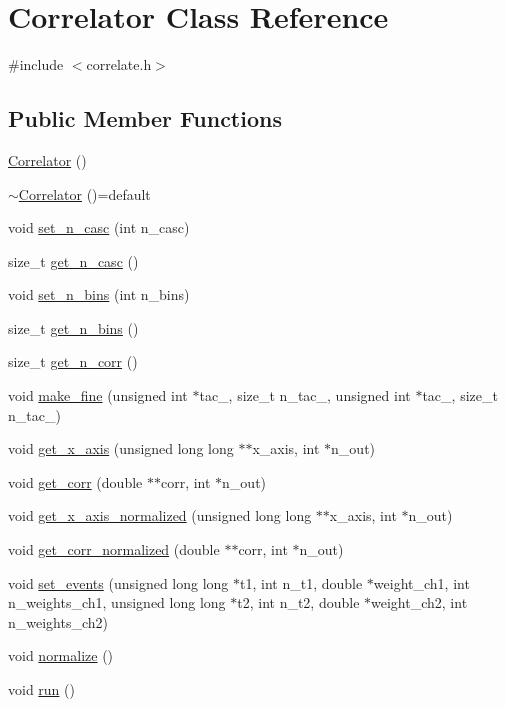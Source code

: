 \hypertarget{class_correlator}{}\section{Correlator Class Reference}
\label{class_correlator}


{\ttfamily \#include $<$correlate.\+h$>$}

\subsection*{Public Member Functions}
\begin{DoxyCompactItemize}
\item 
\hyperlink{class_correlator_a6114955836dba0b4b61138490cd3fe91}{Correlator} ()
\item 
\hyperlink{class_correlator_a85102747d6ae6ff216218a001683b942}{$\sim$\+Correlator} ()=default
\item 
void \hyperlink{class_correlator_a8e96a0c2d5235e912965632b280da01b}{set\+\_\+n\+\_\+casc} (int n\+\_\+casc)
\item 
size\+\_\+t \hyperlink{class_correlator_a0240bc7c9704530dcd61cdd2713143b3}{get\+\_\+n\+\_\+casc} ()
\item 
void \hyperlink{class_correlator_adbce9483839ba3985398176a5cf1822e}{set\+\_\+n\+\_\+bins} (int n\+\_\+bins)
\item 
size\+\_\+t \hyperlink{class_correlator_a0f11555de3ab1c568f2c849e849a513e}{get\+\_\+n\+\_\+bins} ()
\item 
size\+\_\+t \hyperlink{class_correlator_a657815ec6b5c96624826bdbe0ec8d4d9}{get\+\_\+n\+\_\+corr} ()
\item 
void \hyperlink{class_correlator_a98605e701052a2fefc798424483909b0}{make\+\_\+fine} (unsigned int $\ast$tac\+\_, size\+\_\+t n\+\_\+tac\+\_, unsigned int $\ast$tac\+\_, size\+\_\+t n\+\_\+tac\+\_)
\item 
void \hyperlink{class_correlator_a277e6652097f81aa1870c4a04485ba41}{get\+\_\+x\+\_\+axis} (unsigned long long $\ast$$\ast$x\+\_\+axis, int $\ast$n\+\_\+out)
\item 
void \hyperlink{class_correlator_aecdb727bbdb02330f00f7b19564db448}{get\+\_\+corr} (double $\ast$$\ast$corr, int $\ast$n\+\_\+out)
\item 
void \hyperlink{class_correlator_a8ad9be08f71ef766292bf67145acba99}{get\+\_\+x\+\_\+axis\+\_\+normalized} (unsigned long long $\ast$$\ast$x\+\_\+axis, int $\ast$n\+\_\+out)
\item 
void \hyperlink{class_correlator_a1575020c5bc498208ad59e92731dd066}{get\+\_\+corr\+\_\+normalized} (double $\ast$$\ast$corr, int $\ast$n\+\_\+out)
\item 
void \hyperlink{class_correlator_a57e67409c1784f6582d80ae72b642e5b}{set\+\_\+events} (unsigned long long $\ast$t1, int n\+\_\+t1, double $\ast$weight\+\_\+ch1, int n\+\_\+weights\+\_\+ch1, unsigned long long $\ast$t2, int n\+\_\+t2, double $\ast$weight\+\_\+ch2, int n\+\_\+weights\+\_\+ch2)
\item 
void \hyperlink{class_correlator_a0d904b7fc2724287c646aad5909b8671}{normalize} ()
\item 
void \hyperlink{class_correlator_a5ed562f28f104690743a9c053b4ca1a9}{run} ()
\end{DoxyCompactItemize}
